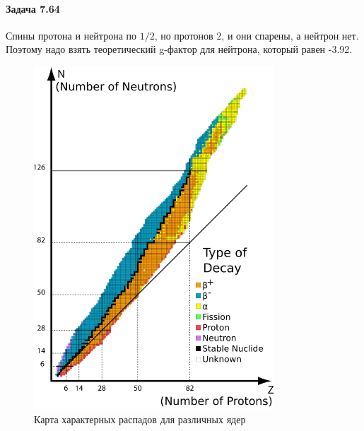 \documentclass[12pt]{article}
\begin{document}
\paragraph{Задача 7.64} Спины протона и нейтрона по $1/2$, но протонов 2, и они спарены, а нейтрон нет. Поэтому надо взять теоретический g-фактор для нейтрона, который равен -3.92.

\begin{figure}[h]
    \centering
    \includegraphics[width=0.8\textwidth,height=\textheight,keepaspectratio]{Seminar_09/pics/pic_table_isotopes.png}
    \caption{Карта характерных распадов для различных ядер}
    \label{fig:sem_09_isotopes}
\end{figure}
\end{document}
